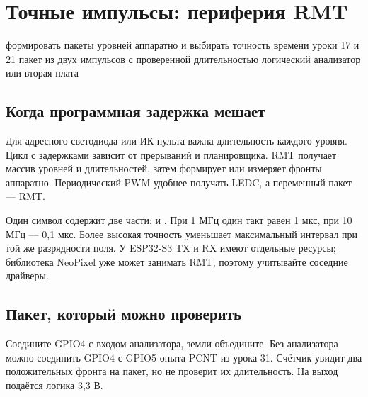 \section{Точные импульсы: периферия RMT}\label{les:rmt}
\lessonintro
  {формировать пакеты уровней аппаратно и выбирать точность времени}
  {уроки 17 и 21}
  {пакет из двух импульсов с проверенной длительностью}
  {логический анализатор или вторая плата}

\subsection{Когда программная задержка мешает}
Для адресного светодиода или ИК-пульта важна длительность каждого уровня. Цикл с задержками
зависит от прерываний и планировщика. RMT получает массив уровней и длительностей, затем
формирует или измеряет фронты аппаратно. Периодический PWM удобнее получать LEDC,
а переменный пакет --- RMT.

Один символ содержит две части:  и .
При 1 МГц один такт равен 1 мкс, при 10 МГц --- 0,1 мкс. Более высокая точность уменьшает
максимальный интервал при той же разрядности поля. У ESP32-S3 TX и RX имеют отдельные ресурсы;
библиотека NeoPixel уже может занимать RMT, поэтому учитывайте соседние драйверы.

\subsection{Пакет, который можно проверить}
Соедините GPIO4 с входом анализатора, земли объедините. Без анализатора можно соединить GPIO4
с GPIO5 опыта PCNT из урока 31. Счётчик увидит два положительных фронта на пакет,
но не проверит их длительность. На выход подаётся логика 3,3 В.

